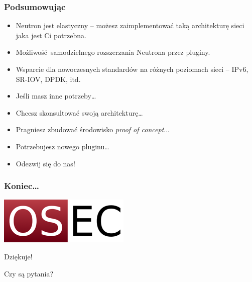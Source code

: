 \documentclass[dvipsnames,table]{beamer}
\begin{document}
\begin{frame}
	\frametitle{Podsumowując}
\begin{itemize}
	\item Neutron jest elastyczny -- możesz zaimplementować taką architekturę sieci jaka jest Ci potrzebna.
	\item Możliwość samodzielnego rozszerzania Neutrona przez pluginy.
	\item Wsparcie dla nowoczesnych standardów na różnych poziomach sieci -- IPv6, SR-IOV, DPDK, itd.
	\item Jeśli masz inne potrzeby\dots
	\item Chcesz skonsultować swoją architekturę\dots
	\item Pragniesz zbudować środowisko {\em proof of concept}...
	\item Potrzebujesz nowego pluginu\dots
	\item Odezwij się do nas! 
\end{itemize}
\end{frame}

\begin{frame}
\frametitle{Koniec\ldots}
\begin{center}
\includegraphics[scale=0.5]{img-oseclogo.png}

Dziękuje!

Czy są pytania?

\end{center}
\end{frame}
\end{document}
